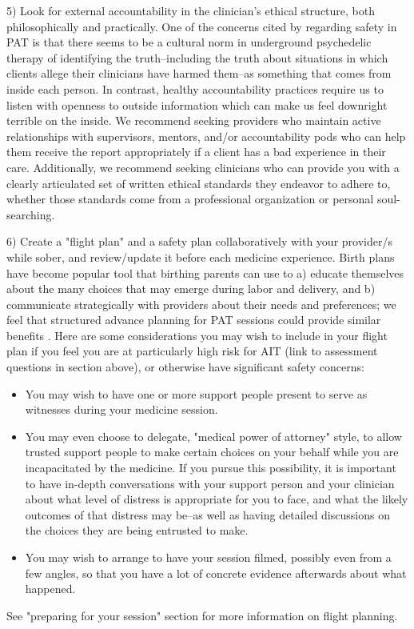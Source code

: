 \documentclass[12pt,letterpaper]{book}
\begin{document}
5) Look for external accountability in the clinician’s ethical structure, both philosophically and practically. One of the concerns cited by \textcite{powerTrip} regarding safety in PAT is that there seems to be a cultural norm in underground psychedelic therapy of identifying the truth--including the truth about situations in which clients allege their clinicians have harmed them--as something that comes from inside each person. In contrast, healthy accountability practices require us to listen with openness to outside information which can make us feel downright terrible on the inside. We recommend seeking providers who maintain active relationships with supervisors, mentors, and/or accountability pods \cite{podmapping} who can help them receive the report appropriately if a client has a bad experience in their care. Additionally, we recommend seeking clinicians who can provide you with a clearly articulated set of written ethical standards they endeavor to adhere to, whether those standards come from a professional organization or personal soul-searching. 

6) Create a "flight plan" and a safety plan collaboratively with your provider/s while sober, and review/update it before each medicine experience. Birth plans have become popular tool that birthing parents can use to a) educate themselves about the many choices that may emerge during labor and delivery, and b) communicate strategically with providers about their needs and preferences; we feel that structured advance planning for PAT sessions could provide similar benefits \cite{birthPlan}. Here are some considerations you may wish to include in your flight plan if you feel you are at particularly high risk for AIT (link to assessment questions in section above), or otherwise have significant safety concerns:
\begin{itemize}
    \item You may wish to have one or more support people present to serve as witnesses during your medicine session. 
    \item You may even choose to delegate, "medical power of attorney" style, to allow trusted support people to make certain choices on your behalf while you are incapacitated by the medicine. If you pursue this possibility, it is important to have in-depth conversations with your support person and your clinician about what level of distress is appropriate for you to face, and what the likely outcomes of that distress may be--as well as having detailed discussions on the choices they are being entrusted to make. 
    \item You may wish to arrange to have your session filmed, possibly even from a few angles, so that you have a lot of concrete evidence afterwards about what happened.
\end{itemize}
See "preparing for your session" section for more information on flight planning. 
\end{document}
